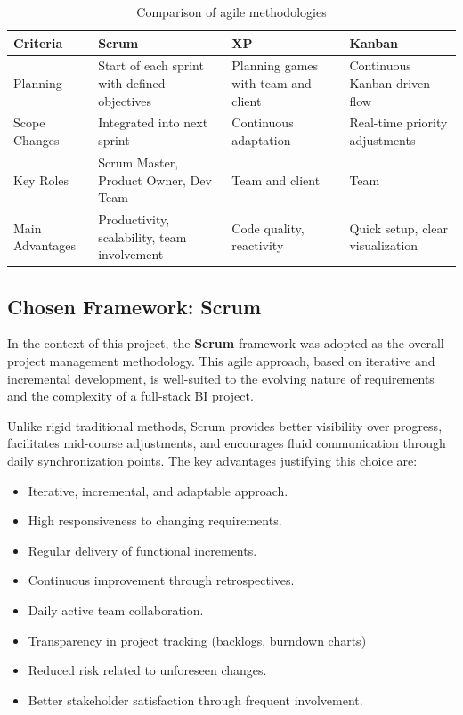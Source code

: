 \begin{table}[H]
\centering
\small
\caption{Comparison of agile methodologies}
\label{tab:comparaison_methodes_agiles}
\begin{tabular}{|p{2.8cm}|p{3.8cm}|p{3.8cm}|p{3.8cm}|}
\hline
\rowcolor{blue!15}
\textbf{Criteria} & \textbf{Scrum} & \textbf{XP} & \textbf{Kanban} \\
\hline
Planning & Start of each sprint with defined objectives & Planning games with team and client & Continuous Kanban-driven flow \\
\hline
Scope Changes & Integrated into next sprint & Continuous adaptation & Real-time priority adjustments \\
\hline
Key Roles & Scrum Master, Product Owner, Dev Team & Team and client & Team \\
\hline
Main Advantages & Productivity, scalability, team involvement & Code quality, reactivity & Quick setup, clear visualization \\
\hline
\end{tabular}
\end{table}

\subsection{Chosen Framework: Scrum}

In the context of this project, the \textbf{Scrum} framework was adopted as the overall
project management methodology. This agile approach, based on iterative and incremental
development, is well-suited to the evolving nature of requirements and the complexity of a
full-stack BI project.

Unlike rigid traditional methods, Scrum provides better visibility over progress, facilitates
mid-course adjustments, and encourages fluid communication through daily synchronization
points. The key advantages justifying this choice are:

\begin{itemize}
    \item Iterative, incremental, and adaptable approach.
    \item High responsiveness to changing requirements.
    \item Regular delivery of functional increments.
    \item Continuous improvement through retrospectives.
    \item Daily active team collaboration.
    \item Transparency in project tracking (backlogs, burndown charts)
    \item Reduced risk related to unforeseen changes.
    \item Better stakeholder satisfaction through frequent involvement.
\end{itemize}

